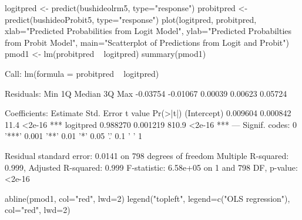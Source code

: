 \begin{Schunk}
\begin{Sinput}
 logitpred <- predict(bushideolrm5, type="response")
 probitpred <- predict(bushideoProbit5, type="response")
 plot(logitpred, probitpred, xlab="Predicted Probabilities from Logit Model", ylab="Predicted Probabilties from Probit Model", main="Scatterplot of Predictions from Logit and Probit")
 pmod1 <- lm(probitpred ~ logitpred)
 summary(pmod1)
\end{Sinput}
\begin{Soutput}
Call:
lm(formula = probitpred ~ logitpred)

Residuals:
     Min       1Q   Median       3Q      Max 
-0.03754 -0.01067  0.00039  0.00623  0.05724 

Coefficients:
            Estimate Std. Error t value Pr(>|t|)    
(Intercept) 0.009604   0.000842    11.4   <2e-16 ***
logitpred   0.988270   0.001219   810.9   <2e-16 ***
---
Signif. codes:  0 '***' 0.001 '**' 0.01 '*' 0.05 '.' 0.1 ' ' 1

Residual standard error: 0.0141 on 798 degrees of freedom
Multiple R-squared:  0.999,	Adjusted R-squared:  0.999 
F-statistic: 6.58e+05 on 1 and 798 DF,  p-value: <2e-16
\end{Soutput}
\begin{Sinput}
 abline(pmod1, col="red", lwd=2)
 legend("topleft", legend=c("OLS regression"), col="red", lwd=2)
\end{Sinput}
\end{Schunk}
